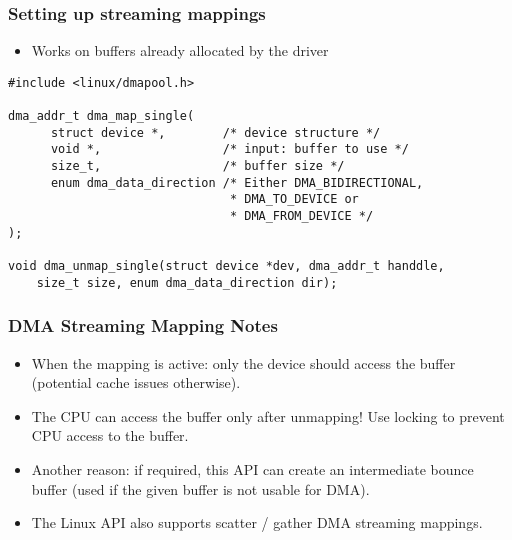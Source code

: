 \begin{frame}[fragile]
  \frametitle{Setting up streaming mappings}
  \begin{itemize}
  \item Works on buffers already allocated by the driver
  \end{itemize}
\begin{verbatim}
#include <linux/dmapool.h>

dma_addr_t dma_map_single(
      struct device *,        /* device structure */
      void *,                 /* input: buffer to use */
      size_t,                 /* buffer size */
      enum dma_data_direction /* Either DMA_BIDIRECTIONAL,
                               * DMA_TO_DEVICE or
                               * DMA_FROM_DEVICE */
);

void dma_unmap_single(struct device *dev, dma_addr_t handdle,
    size_t size, enum dma_data_direction dir);
\end{verbatim}
\end{frame}

\begin{frame}
  \frametitle{DMA Streaming Mapping Notes}
  \begin{itemize}
  \item When the mapping is active: only the device should access the
    buffer (potential cache issues otherwise).
  \item The CPU can access the buffer only after unmapping! Use
    locking to prevent CPU access to the buffer.
  \item Another reason: if required, this API can create an
    intermediate bounce buffer (used if the given buffer is not usable
    for DMA).
  \item The Linux API also supports scatter / gather DMA streaming
    mappings.
  \end{itemize}
\end{frame}
